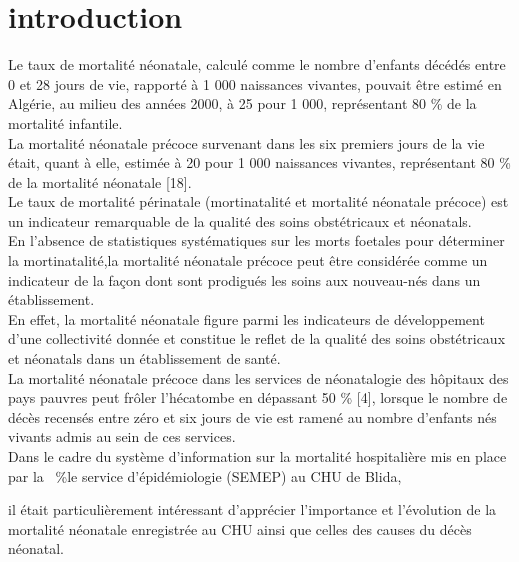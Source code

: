 
\section{introduction}
Le taux de mortalité néonatale, calculé comme le nombre
d’enfants décédés entre 0 et 28 jours de vie, rapporté à 1 000
naissances vivantes, pouvait être estimé en Algérie, au milieu
des années 2000, à 25 pour 1 000, représentant 80 \% de la
mortalité infantile.\\ 

La mortalité néonatale précoce survenant
dans les six premiers jours de la vie était, quant à elle, estimée
à 20 pour 1 000 naissances vivantes, représentant 80 \% de la
mortalité néonatale [18].\\

Le taux de mortalité périnatale (mortinatalité et mortalité
néonatale précoce) est un indicateur remarquable de la
qualité des soins obstétricaux et néonatals.\\

En l’absence de statistiques systématiques sur les morts foetales pour déterminer la mortinatalité,la mortalité néonatale
précoce peut être considérée comme un indicateur de la façon dont
sont prodigués les soins aux nouveau-nés dans un établissement.\\

En effet, la mortalité néonatale figure parmi les
indicateurs de développement d’une collectivité donnée
et constitue le reflet de la qualité des soins obstétricaux et
néonatals dans un établissement de santé.\\

La mortalité néonatale précoce dans les services de
néonatalogie des hôpitaux des pays pauvres peut frôler
l’hécatombe en dépassant 50 \% [4], lorsque le nombre de
décès recensés entre zéro et six jours de vie est ramené au
nombre d’enfants nés vivants admis au sein de ces services.\\

Dans le cadre du système d’information sur la mortalité
hospitalière mis en place par la \dsp \ 
\%le service d’épidémiologie (SEMEP) au CHU de Blida, 

il était particulièrement intéressant d’apprécier l’importance et l’évolution de la mortalité néonatale enregistrée au CHU ainsi que celles des causes du décès néonatal.